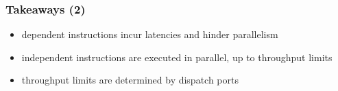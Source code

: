 \documentclass[12pt,dvipdfmx]{beamer}
\begin{document}
\begin{frame}
\frametitle{Takeaways (2)}
\begin{itemize}
\item dependent instructions incur latencies and hinder parallelism
\begin{center}
\def\svgwidth{0.6\textwidth}
{\scriptsize }
\end{center}

\item independent instructions are executed in parallel, 
  up to throughput limits
\begin{center}
\def\svgwidth{0.6\textwidth}
{\scriptsize }
\end{center}

\item throughput limits are determined by dispatch ports
\end{itemize}
\end{frame}
\end{document}
